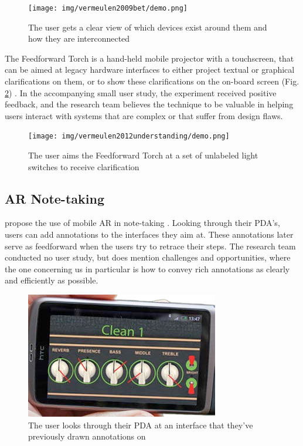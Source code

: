 \documentclass[a4paper,fancychapters]{article}
\begin{document}
	\begin{figure}
		\centering
		\texttt{[image: img/vermeulen2009bet/demo.png]}
		\caption{The user gets a clear view of which devices exist around them and how they are interconnected \cite{vermeulen2009bet}}
		\label{fig:vermeulen2009bet_demo}
	\end{figure}
	
	The Feedforward Torch is a hand-held mobile projector with a touchscreen, that can be aimed at legacy hardware interfaces to either project textual or graphical clarifications on them, or to show these clarifications on the on-board screen (Fig. \ref{fig:vermeulen2012understanding_demo}) \cite{vermeulen2012understanding}. In the accompanying small user study, the experiment received positive feedback, and the research team believes the technique to be valuable in helping users interact with systems that are complex or that suffer from design flaws.
	
	\begin{figure}
		\centering
		\texttt{[image: img/vermeulen2012understanding/demo.png]}
		\caption{The user aims the Feedforward Torch at a set of unlabeled light switches to receive clarification \cite{vermeulen2012understanding}}
		\label{fig:vermeulen2012understanding_demo}
	\end{figure}

	\subsection{AR Note-taking} \label{subsection_ar_note-taking}
	\citeauthor{liu2011mobile} propose the use of mobile AR in note-taking \cite{liu2011mobile}. Looking through their PDA's, users can add annotations to the interfaces they aim at. These annotations later serve as feedforward when the users try to retrace their steps. The research team conducted no user study, but does mention challenges and opportunities, where the one concerning us in particular is how to convey rich annotations as clearly and efficiently as possible.
	
	\begin{figure}
		\centering
		\includegraphics[width=0.7\linewidth]{img/liu2011mobile/demo.png}
		\caption{The user looks through their PDA at an interface that they've previously drawn annotations on \cite{liu2011mobile}}
		\label{fig:liu2011mobile_demo}
	\end{figure}
	
\end{document}
